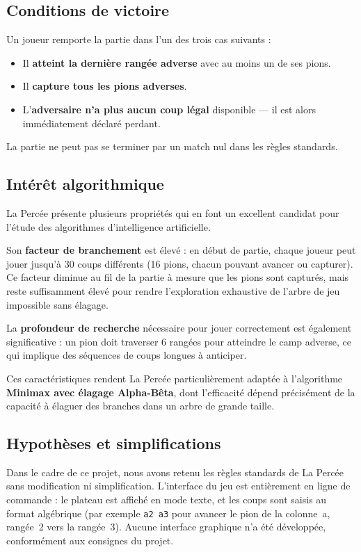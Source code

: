 \documentclass[a4paper,12pt]{report}
\begin{document}
\subsection{Conditions de victoire}

Un joueur remporte la partie dans l'un des trois cas suivants :

\begin{itemize}
  \item Il \textbf{atteint la dernière rangée adverse} avec au moins un de ses pions.
  \item Il \textbf{capture tous les pions adverses}.
  \item L'\textbf{adversaire n'a plus aucun coup légal} disponible --- il est alors immédiatement déclaré perdant.
\end{itemize}

La partie ne peut pas se terminer par un match nul dans les règles standards.

\subsection{Intérêt algorithmique}

La Percée présente plusieurs propriétés qui en font un excellent candidat pour l'étude des
algorithmes d'intelligence artificielle.

Son \textbf{facteur de branchement} est élevé : en début de partie, chaque joueur peut jouer
jusqu'à 30 coups différents (16 pions, chacun pouvant avancer ou capturer). Ce facteur
diminue au fil de la partie à mesure que les pions sont capturés, mais reste suffisamment
élevé pour rendre l'exploration exhaustive de l'arbre de jeu impossible sans élagage.

La \textbf{profondeur de recherche} nécessaire pour jouer correctement est également significative :
un pion doit traverser 6 rangées pour atteindre le camp adverse, ce qui implique des
séquences de coups longues à anticiper.

Ces caractéristiques rendent La Percée particulièrement adaptée à l'algorithme
\textbf{Minimax avec élagage Alpha-Bêta}, dont l'efficacité dépend précisément de la capacité
à élaguer des branches dans un arbre de grande taille.

\subsection{Hypothèses et simplifications}

Dans le cadre de ce projet, nous avons retenu les règles standards de La Percée sans
modification ni simplification. L'interface du jeu est entièrement en ligne de commande :
le plateau est affiché en mode texte, et les coups sont saisis au format algébrique
(par exemple \texttt{a2 a3} pour avancer le pion de la colonne~a, rangée~2 vers la rangée~3).
Aucune interface graphique n'a été développée, conformément aux consignes du projet.
\end{document}
